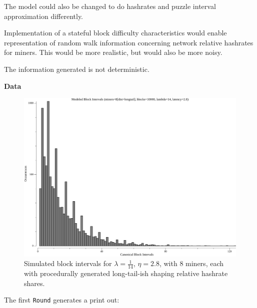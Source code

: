 \documentclass[11pt]{article}
\begin{document}
	The model could also be changed to do hashrates and puzzle interval
	approximation differently.

	Implementation of a stateful block difficulty characteristics would enable
	representation of random walk information concerning network relative hashrates
	for miners. This would be more realistic, but would also be more noisy.



	The information generated is not deterministic.

	\textbf{Data}


	\begin{figure}[tph]
		\centering
		\includegraphics[width=1.0\textwidth]{go-poisson_A0_blockIntervals.png}
		\caption{
			Simulated block intervals for $\lambda=\frac{1}{14}$, $\eta=2.8$, with
			$8$ miners, each with procedurally generated long-tail-ish shaping
			relative hashrate shares.
		}
	\end{figure}

	\pagebreak

	The first \texttt{Round} generates a print out:
\end{document}
